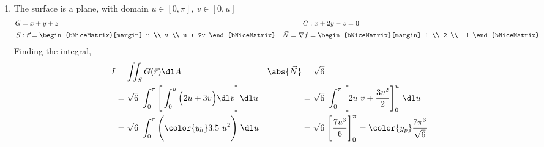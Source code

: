 \begin{enumerate}
    \item The surface is a plane, with domain $ u \in [0, \pi],\ v \in [0, u] $
          \begin{align}
              G                  & = x + y + z
                                 &
              C                  & : x + 2y - z = 0             \\
              S                  & : \vec{r} =
              \begin{bNiceMatrix}[margin]
                  u \\ v \\ u + 2v
              \end{bNiceMatrix}
                                 &
              \vec{N} = \nabla f & = \begin{bNiceMatrix}[margin]
                                         1 \\ 2 \\ -1
                                     \end{bNiceMatrix}
          \end{align}
          Finding the integral,
          \begin{align}
              I                  & = \iint_S G(\vec{r}) \dl A        &
              \abs{\vec{N}}      & = \sqrt{6}                          \\
                                 & = \sqrt{6}\ \int_{0}^{\pi}
              \Bigg[\int_{0}^{u} \Big( 2u + 3v \Big)
              \dl v \Bigg] \dl u &
                                 & = \sqrt{6}\ \int_{0}^{\pi}
              \Bigg[ 2u\ v + \frac{3v^2}{2}
              \Bigg]_0^{u} \ \dl u                                     \\
                                 & = \sqrt{6}\ \int_{0}^{\pi}
              \Bigg( {\color{y_h} 3.5\ u^2} \Bigg)
              \ \dl u            &
                                 & = \sqrt{6}\ \Bigg[ \frac{7u^3}{6}
                  \Bigg]_{0}^{\pi} = \color{y_p} \frac{7\pi^3}{\sqrt{6}}
          \end{align}


\end{enumerate}
